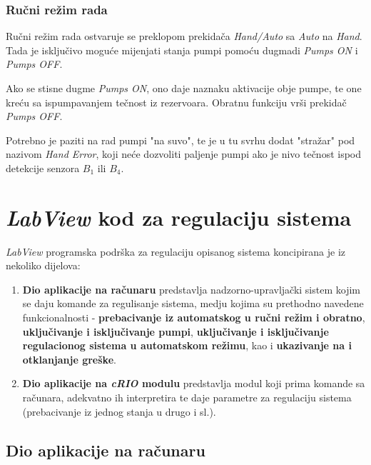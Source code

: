 \documentclass[12pt, titlepage]{article}
\begin{document}
            \subsubsection{Ručni režim rada}

                Ručni režim rada ostvaruje se preklopom prekidača \textit{Hand/Auto} sa \textit{Auto} na \textit{Hand}.
                Tada je isključivo moguće mijenjati stanja pumpi pomoću dugmadi \textit{Pumps ON} i \textit{Pumps OFF}.
                
                Ako se stisne dugme \textit{Pumps ON}, ono daje naznaku aktivacije obje pumpe, te one kreću sa 
                ispumpavanjem tečnost iz rezervoara. Obratnu funkciju vrši prekidač \textit{Pumps OFF}.

                Potrebno je paziti na rad pumpi "na suvo", te je u tu svrhu dodat "stražar" pod nazivom \textit{Hand Error},
                koji neće dozvoliti paljenje pumpi ako je nivo tečnost ispod detekcije senzora $B_1$ ili $B_4$.
            
    \section{\textbf{\textit{LabView} kod za regulaciju sistema}}

        \textit{LabView} programska podrška za regulaciju opisanog sistema koncipirana je iz nekoliko dijelova:

        \begin{enumerate}
            \item \textbf{Dio aplikacije na računaru} predstavlja nadzorno-upravljački sistem kojim se daju komande
            za regulisanje sistema, medju kojima su prethodno navedene funkcionalnosti - 
            \textbf{prebacivanje iz automatskog u ručni režim i obratno}, \textbf{uključivanje i isključivanje pumpi}, 
            \textbf{uključivanje i isključivanje regulacionog sistema u automatskom režimu}, kao i \textbf{ukazivanje na i otklanjanje greške}.
            \item \textbf{Dio aplikacije na \textit{cRIO} modulu} predstavlja modul koji prima komande sa računara,
            adekvatno ih interpretira te daje parametre za regulaciju sistema (prebacivanje iz jednog stanja u drugo i sl.).
        \end{enumerate}

        \subsection{\textbf{Dio aplikacije na računaru}}
\end{document}
